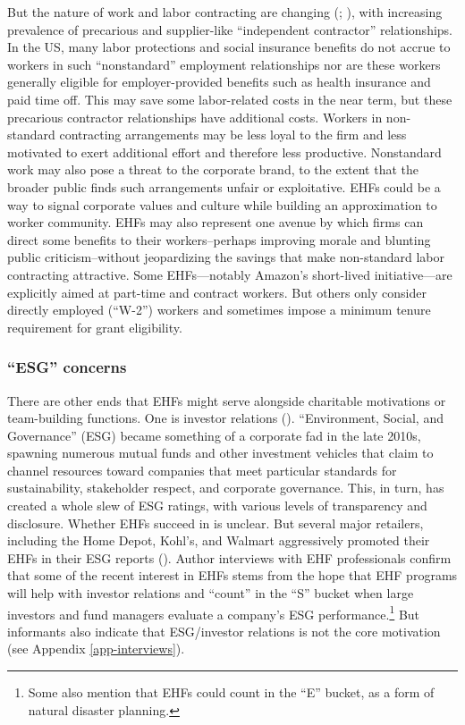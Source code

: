 \documentclass[
  11pt,
  oneside]{article}
\begin{document}
But the nature of work and labor contracting are changing (; ), with increasing prevalence of precarious and supplier-like ``independent contractor'' relationships. In the US, many labor protections and social insurance benefits do not accrue to workers in such ``nonstandard'' employment relationships nor are these workers generally eligible for employer-provided benefits such as health insurance and paid time off. This may save some labor-related costs in the near term, but these precarious contractor relationships have additional costs. Workers in non-standard contracting arrangements may be less loyal to the firm and less motivated to exert additional effort and therefore less productive. Nonstandard work may also pose a threat to the corporate brand, to the extent that the broader public finds such arrangements unfair or exploitative. EHFs could be a way to signal corporate values and culture while building an approximation to worker community. EHFs may also represent one avenue by which firms can direct some benefits to their workers--perhaps improving morale and blunting public criticism--without jeopardizing the savings that make non-standard labor contracting attractive. Some EHFs---notably Amazon's short-lived initiative---are explicitly aimed at part-time and contract workers. But others only consider directly employed (``W-2'') workers and sometimes impose a minimum tenure requirement for grant eligibility.

\subsubsection{``ESG'' concerns}\label{esg-concerns}

There are other ends that EHFs might serve alongside charitable motivations or team-building functions. One is investor relations (). ``Environment, Social, and Governance'' (ESG) became something of a corporate fad in the late 2010s, spawning numerous mutual funds and other investment vehicles that claim to channel resources toward companies that meet particular standards for sustainability, stakeholder respect, and corporate governance. This, in turn, has created a whole slew of ESG ratings, with various levels of transparency and disclosure. Whether EHFs succeed in is unclear. But several major retailers, including the Home Depot, Kohl's, and Walmart aggressively promoted their EHFs in their ESG reports (). Author interviews with EHF professionals confirm that some of the recent interest in EHFs stems from the hope that EHF programs will help with investor relations and ``count'' in the ``S'' bucket when large investors and fund managers evaluate a company's ESG performance.\footnote{Some also mention that EHFs could count in the ``E'' bucket, as a form of natural disaster planning.} But informants also indicate that ESG/investor relations is not the core motivation (see Appendix \ref{app-interviews}).
\end{document}
